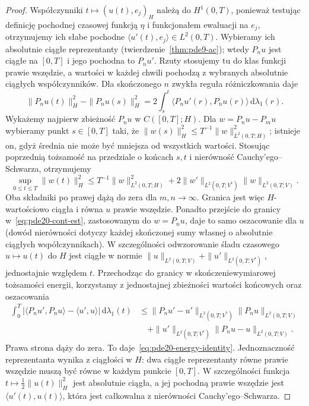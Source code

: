 \begin{proof}
Współczynniki $t\mapsto (u(t),e_j)_H$ należą do $H^1(0,T)$,
ponieważ testując definicję pochodnej czasowej
funkcją $\eta$ i funkcjonałem ewaluacji na $e_j$,
otrzymujemy ich słabe pochodne
$\langle u'(t),e_j\rangle\in L^2(0,T)$.
Wybieramy ich absolutnie ciągłe reprezentanty
(twierdzenie~\ref{thm:pde9-ac}); wtedy $P_nu$
jest ciągłe na $[0,T]$ i jego pochodna to $P_nu'$.
Rzuty stosujemy tu do klas funkcji prawie wszędzie,
a wartości w każdej chwili pochodzą z wybranych
absolutnie ciągłych współczynników.
Dla skończonego $n$ zwykła reguła różniczkowania daje
\[
 \|P_nu(t)\|_H^2-\|P_nu(s)\|_H^2
 =2\int_s^t\langle P_nu'(r),P_nu(r)\rangle\,\mathrm d\lambda_1(r).
\]
Wykażemy najpierw zbieżność $P_nu$ w $C([0,T];H)$.
Dla $w=P_nu-P_mu$ wybieramy punkt $s\in[0,T]$ taki, że
$\|w(s)\|_H^2\le T^{-1}\|w\|_{L^2(0,T;H)}^2$;
istnieje on, gdyż średnia nie może być mniejsza od wszystkich wartości.
Stosując poprzednią tożsamość na przedziale o końcach $s,t$
i nierówność Cauchy'ego--Schwarza, otrzymujemy
\begin{equation}\label{eq:pde20-cont-est}
 \sup_{0\le t\le T}\|w(t)\|_H^2
 \le T^{-1}\|w\|_{L^2(0,T;H)}^2
 +2\|w'\|_{L^2(0,T;V^*)}\|w\|_{L^2(0,T;V)}.
\end{equation}
Oba składniki po prawej dążą do zera dla $m,n\to\infty$.
Granica jest więc $H$-wartościowo ciągła i równa $u$
prawie wszędzie. Ponadto przejście do granicy
w~\eqref{eq:pde20-cont-est}, zastosowanym do $w=P_nu$,
daje to samo oszacowanie dla $u$ (dowód nierówności
dotyczy każdej skończonej sumy własnej o absolutnie
ciągłych współczynnikach).
W szczególności odwzorowanie śladu czasowego
$u\mapsto u(t)$ do $H$ jest ciągłe w normie
$\|u\|_{L^2(0,T;V)}+\|u'\|_{L^2(0,T;V^*)}$,
jednostajnie względem $t$.
Przechodząc do granicy w skończeniewymiarowej
tożsamości energii, korzystamy z jednostajnej zbieżności
wartości końcowych oraz oszacowania
\[
 \begin{split}
 \int_0^T|\langle P_nu',P_nu\rangle-\langle u',u\rangle|
 \,\mathrm d\lambda_1(t)
 &\le \|P_nu'-u'\|_{L^2(0,T;V^*)}\|P_nu\|_{L^2(0,T;V)}\\
 &\quad+\|u'\|_{L^2(0,T;V^*)}\|P_nu-u\|_{L^2(0,T;V)}.
 \end{split}
\]
Prawa strona dąży do zera. To daje~\eqref{eq:pde20-energy-identity}.
Jednoznaczność reprezentanta wynika z ciągłości w $H$:
dwa ciągłe reprezentanty równe prawie wszędzie muszą
być równe w każdym punkcie $[0,T]$.
W szczególności funkcja $t\mapsto\frac12\|u(t)\|_H^2$
jest absolutnie ciągła, a jej pochodną prawie wszędzie
jest $\langle u'(t),u(t)\rangle$, która jest całkowalna
z nierówności Cauchy'ego--Schwarza.
\end{proof}

